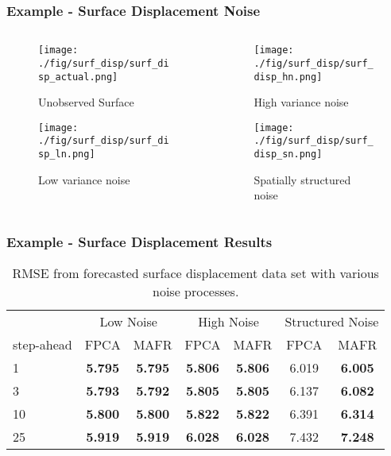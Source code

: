 \documentclass[aspectratio=169]{beamer}
\begin{document}
  \begin{frame}
    \frametitle{Example - Surface Displacement Noise}
    \begin{columns}[t]
      \begin{column}{.5\textwidth}
      \begin{figure}
        \texttt{[image: ./fig/surf\_disp/surf\_disp\_actual.png]}
      \caption{Unobserved Surface}
      \end{figure}%
      \begin{figure}
      \texttt{[image: ./fig/surf\_disp/surf\_disp\_ln.png]}
      \caption{Low variance noise}
      \end{figure}
      \end{column}
      \begin{column}{.5\textwidth}
      \begin{figure}
      \texttt{[image: ./fig/surf\_disp/surf\_disp\_hn.png]}
      \caption{High variance noise}
      \end{figure}%
      \begin{figure}
      \texttt{[image: ./fig/surf\_disp/surf\_disp\_sn.png]}
      \caption{Spatially structured noise}
      \end{figure}
      \end{column}
    \end{columns}
  \end{frame}
  
  \begin{frame}
    \frametitle{Example - Surface Displacement Results}
    \begin{table}[h]
        \setlength{\arrayrulewidth}{1.5px}
        \setlength{\tabcolsep}{10pt}
        \centering
        \begin{tabular}{lcccccc} \toprule
            & \multicolumn{2}{c}{Low Noise} & \multicolumn{2}{c}{High Noise} & \multicolumn{2}{c}{Structured Noise} \\
            step-ahead & FPCA & MAFR & FPCA & MAFR & FPCA & MAFR \\ \bottomrule
            1 & \textbf{5.795} & \textbf{5.795} & \textbf{5.806} & \textbf{5.806} & 6.019 & \textbf{6.005} \\
            3 & \textbf{5.793} & \textbf{5.792} & \textbf{5.805} & \textbf{5.805} & 6.137 & \textbf{6.082} \\
            10 & \textbf{5.800} & \textbf{5.800} & \textbf{5.822} & \textbf{5.822} & 6.391 & \textbf{6.314} \\
            25 & \textbf{5.919} & \textbf{5.919} & \textbf{6.028} & \textbf{6.028} & 7.432 & \textbf{7.248} \\
            \bottomrule
        \end{tabular}
        \caption{RMSE from forecasted surface displacement data set with various noise processes.}
    \end{table}
  \end{frame}
\end{document}
